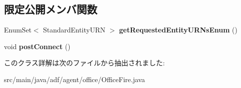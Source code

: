 \subsection*{限定公開メンバ関数}
\begin{DoxyCompactItemize}
\item 
\hypertarget{classadf_1_1agent_1_1office_1_1OfficeFire_a1ad22c57d0f7649c111b65217b779193}{}\label{classadf_1_1agent_1_1office_1_1OfficeFire_a1ad22c57d0f7649c111b65217b779193} 
Enum\+Set$<$ Standard\+Entity\+U\+RN $>$ {\bfseries get\+Requested\+Entity\+U\+R\+Ns\+Enum} ()
\item 
\hypertarget{classadf_1_1agent_1_1office_1_1OfficeFire_ada55a932ac893b51205a4339df032102}{}\label{classadf_1_1agent_1_1office_1_1OfficeFire_ada55a932ac893b51205a4339df032102} 
void {\bfseries post\+Connect} ()
\end{DoxyCompactItemize}


このクラス詳解は次のファイルから抽出されました\+:\begin{DoxyCompactItemize}
\item 
src/main/java/adf/agent/office/Office\+Fire.\+java\end{DoxyCompactItemize}

